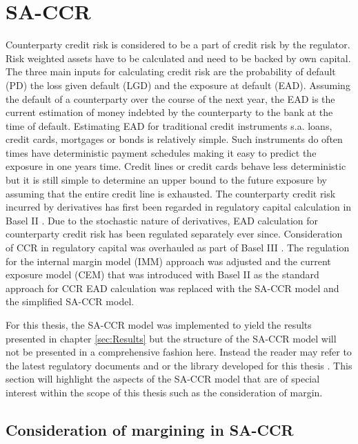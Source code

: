 \documentclass[../Thesis_AHoecherl.tex]{subfiles}
\begin{document}
\section{SA-CCR}\label{SA-CCR}

Counterparty credit risk is considered to be a part of credit risk by the regulator. Risk weighted assets have to be calculated and need to be backed by own capital. The three main inputs for calculating credit risk are the probability of default (PD) the loss given default (LGD) and the exposure at default (EAD). Assuming the default of a counterparty over the course of the next year, the \gls{EAD} is the current estimation of money indebted by the counterparty to the bank at the time of default. Estimating \gls{EAD} for traditional credit instruments s.a. loans, credit cards, mortgages or bonds is relatively simple. Such instruments do often times have deterministic payment schedules making it easy to predict the exposure in one years time. Credit lines or credit cards behave less deterministic but it is still simple to determine an upper bound to the future exposure by assuming that the entire credit line is exhausted.
The counterparty credit risk incurred by derivatives has first been regarded in regulatory capital calculation in Basel II \cite{basel2}. Due to the stochastic nature of derivatives, \gls{EAD} calculation for counterparty credit risk has been regulated separately ever since. Consideration of \gls{CCR} in regulatory capital was overhauled as part of Basel III \cite{CRE}. The regulation for the internal margin model (\gls{IMM}) approach was adjusted and the current exposure model (\gls{CEM}) that was introduced with Basel II as the standard approach for \gls{CCR} \gls{EAD} calculation was replaced with the \gls{SA-CCR} model and the simplified \gls{SA-CCR} model.

For this thesis, the \gls{SA-CCR} model was implemented to yield the results presented in chapter \ref{sec:Results} but the structure of the \gls{SA-CCR} model will not be presented in a comprehensive fashion here. Instead the reader may refer to the latest regulatory documents \cite[Article 274 and following]{CRRII} and \cite{EBA_2019} or the library developed for this thesis \cite{Hoecherl2020}.
This section will highlight the aspects of the \gls{SA-CCR} model that are of special interest within the scope of this thesis such as the consideration of margin. 

\subsection{Consideration of margining in SA-CCR}
\end{document}
